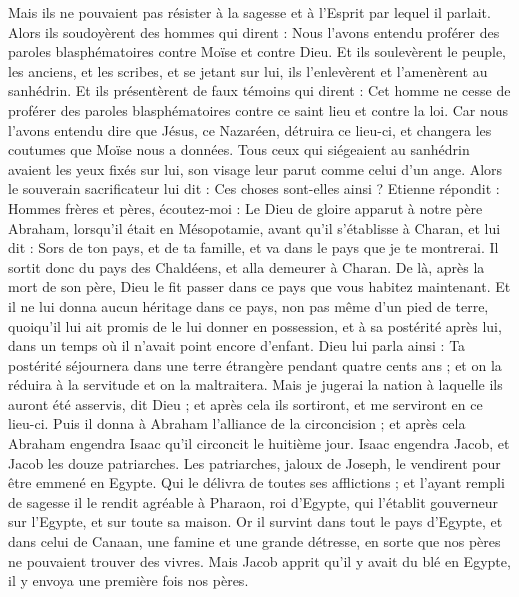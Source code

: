 \begin{multicols}{2}
Mais ils ne pouvaient pas résister à la sagesse et à l'Esprit par lequel il parlait.
Alors ils soudoyèrent des hommes qui dirent : Nous l'avons entendu proférer des paroles blasphématoires contre Moïse et contre Dieu.
Et ils soulevèrent le peuple, les anciens, et les scribes, et se jetant sur lui, ils l'enlevèrent et l'amenèrent au sanhédrin.
Et ils présentèrent de faux témoins qui dirent : Cet homme ne cesse de proférer des paroles blasphématoires contre ce saint lieu et contre la loi.
Car nous l'avons entendu dire que Jésus, ce Nazaréen, détruira ce lieu-ci, et changera les coutumes que Moïse nous a données.
Tous ceux qui siégeaient au sanhédrin avaient les yeux fixés sur lui, son visage leur parut comme celui d'un ange.
\VerseOne{}Alors le souverain sacrificateur lui dit : Ces choses sont-elles ainsi ?
Etienne répondit : Hommes frères et pères, écoutez-moi : Le Dieu de gloire apparut à notre père Abraham, lorsqu'il était en Mésopotamie, avant qu'il s'établisse à Charan, et lui dit :
Sors de ton pays, et de ta famille, et va dans le pays que je te montrerai.
Il sortit donc du pays des Chaldéens, et alla demeurer à Charan. De là, après la mort de son père, Dieu le fit passer dans ce pays que vous habitez maintenant.
Et il ne lui donna aucun héritage dans ce pays, non pas même d'un pied de terre, quoiqu'il lui ait promis de le lui donner en possession, et à sa postérité après lui, dans un temps où il n'avait point encore d'enfant.
Dieu lui parla ainsi : Ta postérité séjournera dans une terre étrangère pendant quatre cents ans ; et on la réduira à la servitude et on la maltraitera.
Mais je jugerai la nation à laquelle ils auront été asservis, dit Dieu ; et après cela ils sortiront, et me serviront en ce lieu-ci.
Puis il donna à Abraham l'alliance de la circoncision ; et après cela Abraham engendra Isaac qu'il circoncit le huitième jour. Isaac engendra Jacob, et Jacob les douze patriarches.
Les patriarches, jaloux de Joseph, le vendirent pour être emmené en Egypte.
Qui le délivra de toutes ses afflictions ; et l'ayant rempli de sagesse il le rendit agréable à Pharaon, roi d'Egypte, qui l'établit gouverneur sur l'Egypte, et sur toute sa maison.
Or il survint dans tout le pays d'Egypte, et dans celui de Canaan, une famine et une grande détresse, en sorte que nos pères ne pouvaient trouver des vivres.
Mais Jacob apprit qu'il y avait du blé en Egypte, il y envoya une première fois nos pères.

\end{multicols}
